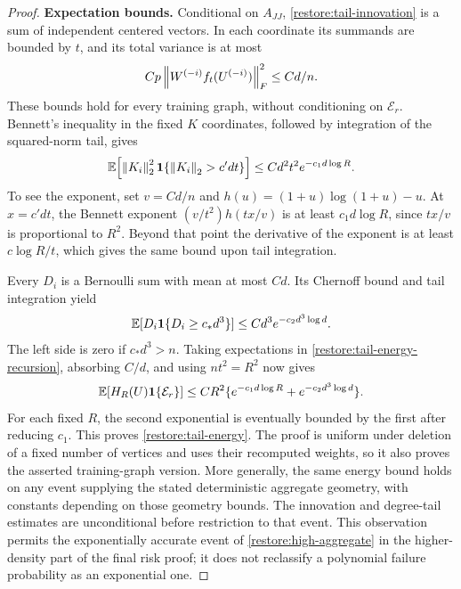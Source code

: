 \begin{proof}
\medskip\noindent\textbf{Expectation bounds.}
Conditional on $A_{JJ}$, \eqref{restore:tail-innovation} is a sum
of independent centered vectors.  In each coordinate its summands
are bounded by $t$, and its total variance is at most
\[
 Cp\left\lVert W^{(-i)}f_t(U^{(-i)})\right\rVert_F^2\le Cd/n.
\]
These bounds hold for every training graph, without conditioning on
$\mathcal E_r$.  Bennett's inequality in the fixed $K$ coordinates,
followed by integration of the squared-norm tail, gives
\begin{equation}
 \mathbb E\!\left[\left\lVert K_i\right\rVert_2^2
                        \mathbf1\{\left\lVert K_i\right\rVert_2>c'dt\}\right]
 \le Cd^2t^2e^{-c_1d\log R}.
 \label{restore:tail-innovation-moment}
\end{equation}
To see the exponent, set $v=Cd/n$ and
$h(u)=(1+u)\log(1+u)-u$.
At $x=c'dt$, the Bennett exponent
$(v/t^2)h(tx/v)$ is at least $c_1d\log R$, since
$tx/v$ is proportional to $R^2$.
Beyond that point the derivative of the exponent is at least
$c\log R/t$, which gives the same bound upon tail integration.

Every $D_i$ is a Bernoulli sum with mean at most $Cd$.
Its Chernoff bound and tail integration yield
\begin{equation}
 \mathbb E[D_i\mathbf1\{D_i\ge c_*d^3\}]
 \le Cd^3e^{-c_2d^3\log d}.
 \label{restore:tail-large-degree-moment}
\end{equation}
The left side is zero if $c_*d^3>n$.
Taking expectations in \eqref{restore:tail-energy-recursion},
absorbing $C/d$, and using $nt^2=R^2$ now gives
\[
 \mathbb E[H_R(U)\mathbf1\{\mathcal E_r\}]
 \le CR^2\{e^{-c_1d\log R}+e^{-c_2d^3\log d}\}.
\]
For each fixed $R$, the second exponential is eventually bounded by
the first after reducing $c_1$.  This proves
\eqref{restore:tail-energy}.  The proof is uniform under deletion
of a fixed number of vertices and uses their recomputed weights,
so it also proves the asserted training-graph version.
More generally, the same energy bound holds on any event supplying
the stated deterministic aggregate geometry, with constants depending
on those geometry bounds. The innovation and degree-tail estimates
are unconditional before restriction to that event. This observation
permits the exponentially accurate event of
\cref{restore:high-aggregate} in the higher-density part of the final
risk proof; it does not reclassify a polynomial failure probability
as an exponential one.
\end{proof}


